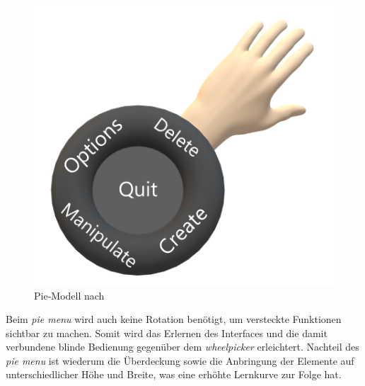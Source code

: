 \begin{figure}[h]
\captionsetup{width=.7\linewidth}
\includegraphics[scale=0.5]{Bilder/Hauptteil/konzept10}
\centering
\caption{Pie-Modell nach~\cite[p.~10]{wheelpickerpiemenu}}
\label{fig:piemenu1}
\end{figure}

\noindent Beim \textit{pie menu} wird auch keine Rotation benötigt, um versteckte Funktionen sichtbar zu machen. Somit wird das Erlernen des Interfaces und die damit verbundene blinde Bedienung gegenüber dem \textit{wheelpicker} erleichtert. Nachteil des \textit{pie menu} ist wiederum die Überdeckung sowie die Anbringung der Elemente auf unterschiedlicher Höhe und Breite, was eine erhöhte Lernkurve zur Folge hat.

